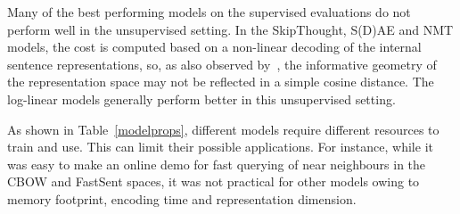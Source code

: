 \vspace{35pt} Many of the best performing models on the supervised evaluations do not perform well in the unsupervised setting. In the SkipThought, S(D)AE and NMT models, the cost is computed based on a non-linear decoding of the internal sentence representations, so, as also observed by~\cite{almahairi2015learning}, the informative geometry of the representation space may not be reflected in a simple cosine distance. The log-linear models generally perform better in this unsupervised setting. 

\vspace{5pt}
As shown in Table~\ref{modelprops}, different models require different resources to train and use. This can limit their possible applications. For instance, while it was easy to make an online demo for fast querying of near neighbours in the CBOW and FastSent spaces, it was not practical for other models owing to memory footprint, encoding time and representation dimension. 
